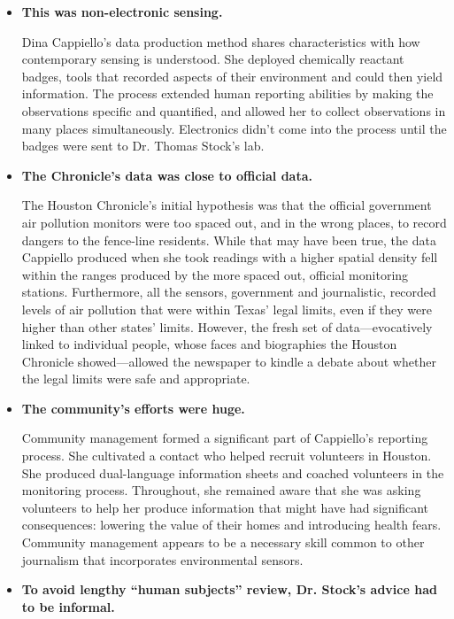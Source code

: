 \begin{itemize}
\item \textbf{This was non-electronic sensing.}

Dina Cappiello's data production method shares characteristics with
how contemporary sensing is understood. She deployed chemically
reactant badges, tools that recorded aspects of their environment and
could then yield information. The process extended human reporting
abilities by making the observations specific and quantified, and
allowed her to collect observations in many places simultaneously.
Electronics didn't come into the process until the badges were sent to
Dr. Thomas Stock's lab.
\item \textbf{The Chronicle's data was close to official data.}

The Houston Chronicle's initial hypothesis was that the official government
air pollution monitors were too spaced out, and in the wrong
places, to record dangers to the fence-line residents. While that may
have been true, the data Cappiello produced when she took readings
with a higher spatial density fell within the ranges produced by
the more spaced out, official monitoring stations. Furthermore, all
the sensors, government and journalistic, recorded levels of air pollution
that were within Texas' legal limits, even if they were higher
than other states' limits. However, the fresh set of data—evocatively
linked to individual people, whose faces and biographies the Houston
Chronicle showed—allowed the newspaper to kindle a debate about
whether the legal limits were safe and appropriate.
\item \textbf{The community's efforts were huge.}

Community management formed a significant part of Cappiello's
reporting process. She cultivated a contact who helped recruit volunteers
in Houston. She produced dual-language information sheets
and coached volunteers in the monitoring process. Throughout, she
remained aware that she was asking volunteers to help her produce
information that might have had significant consequences: lowering
the value of their homes and introducing health fears. Community
management appears to be a necessary skill common to other journalism
that incorporates environmental sensors.
\item \textbf{To avoid lengthy ``human subjects'' review, Dr. Stock's advice
had to be informal.}


\end{itemize}
